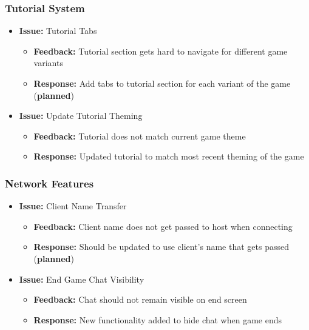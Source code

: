 \documentclass{article}
\begin{document}
\subsubsection{Tutorial System}
\begin{itemize}
    \item \textbf{Issue:} Tutorial Tabs
    \begin{itemize}
        \item \textbf{Feedback:} Tutorial section gets hard to navigate for different game variants
        \item \textbf{Response:} Add tabs to tutorial section for each variant of the game (\textbf{planned})
    \end{itemize}
    
    \item \textbf{Issue:} Update Tutorial Theming
    \begin{itemize}
        \item \textbf{Feedback:} Tutorial does not match current game theme
        \item \textbf{Response:} Updated tutorial to match most recent theming of the game
    \end{itemize}
\end{itemize}

\subsubsection{Network Features}
\begin{itemize}
    \item \textbf{Issue:} Client Name Transfer
    \begin{itemize}
        \item \textbf{Feedback:} Client name does not get passed to host when connecting
        \item \textbf{Response:} Should be updated to use client's name that gets passed (\textbf{planned})
    \end{itemize}
    
    \item \textbf{Issue:} End Game Chat Visibility
    \begin{itemize}
        \item \textbf{Feedback:} Chat should not remain visible on end screen
        \item \textbf{Response:} New functionality added to hide chat when game ends
    \end{itemize}
\end{itemize}
\end{document}
